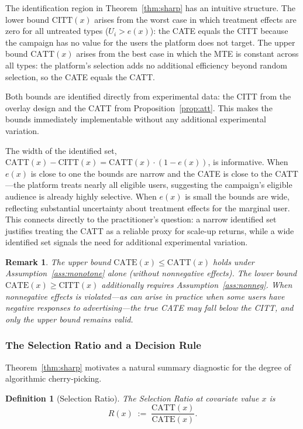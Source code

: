 \documentclass[11pt]{article}
\newtheorem{definition}{Definition}
\newtheorem{remark}{Remark}
\begin{document}
The identification region in Theorem~\ref{thm:sharp} has an intuitive structure.
The lower bound $\mathrm{CITT}(x)$ arises from the worst case in which treatment
effects are zero for all untreated types ($U_i > e(x)$): the CATE equals the
CITT because the campaign has no value for the users the platform does not
target.  The upper bound $\mathrm{CATT}(x)$ arises from the best case in which
the MTE is constant across all types: the platform's selection adds no additional
efficiency beyond random selection, so the CATE equals the CATT.

Both bounds are identified directly from experimental data: the CITT from the
overlay design and the CATT from Proposition~\ref{prop:att}.  This makes the
bounds immediately implementable without any additional experimental variation.

The width of the identified set, $\mathrm{CATT}(x) - \mathrm{CITT}(x) =
\mathrm{CATT}(x)\cdot(1-e(x))$, is informative.  When $e(x)$ is close to one
the bounds are narrow and the CATE is close to the CATT---the platform treats
nearly all eligible users, suggesting the campaign's eligible audience is already
highly selective.  When $e(x)$ is small the bounds are wide, reflecting
substantial uncertainty about treatment effects for the marginal user.  This
connects directly to the practitioner's question: a narrow identified set
justifies treating the CATT as a reliable proxy for scale-up returns, while a
wide identified set signals the need for additional experimental variation.

\begin{remark}
The upper bound $\mathrm{CATE}(x) \leq \mathrm{CATT}(x)$ holds under
Assumption~\ref{ass:monotone} alone (without nonnegative effects).  The lower bound
$\mathrm{CATE}(x) \geq \mathrm{CITT}(x)$ additionally requires
Assumption~\ref{ass:nonneg}.  When nonnegative effects is violated---as can arise in
practice when some users have negative responses to advertising---the true CATE
may fall below the CITT, and only the upper bound remains valid.
\end{remark}

\subsubsection{The Selection Ratio and a Decision Rule}

Theorem~\ref{thm:sharp} motivates a natural summary diagnostic for the degree of
algorithmic cherry-picking.

\begin{definition}[Selection Ratio]
The \emph{Selection Ratio} at covariate value $x$ is
\begin{equation}
  R(x) \;:=\; \frac{\mathrm{CATT}(x)}{\mathrm{CATE}(x)}.
  \label{eq:sr}
\end{equation}
\end{definition}
\end{document}
